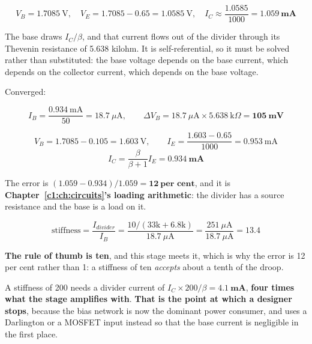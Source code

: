 \[
  V_B = 1.7085\ \text{V}, \quad V_E = 1.7085 - 0.65 = 1.0585\ \text{V}, \quad
  I_C \approx \frac{1.0585}{1000} = \mathbf{1.059\ \text{mA}}
\]


The base draws $I_C/\beta$, and that current flows out of the divider through its Thevenin resistance of 5.638 kilohm. It is self-referential, so it must be solved rather than substituted: the base voltage depends on the base current, which depends on the collector current, which depends on the base voltage.

Converged:

\[
  I_B = \frac{0.934\ \text{mA}}{50} = 18.7\ \mu\text{A}, \qquad
  \Delta V_B = 18.7\ \mu\text{A} \times 5.638\ \text{k}\Omega = \mathbf{105\ \text{mV}}
\]

\[
  V_B = 1.7085 - 0.105 = 1.603\ \text{V}, \qquad I_E = \frac{1.603 - 0.65}{1000}
  = 0.953\ \text{mA}
\]
\[
  I_C = \frac{\beta}{\beta + 1}I_E = \mathbf{0.934\ \text{mA}}
\]

The error is $(1.059 - 0.934)/1.059 = \mathbf{12\ \text{per cent}}$, and it is \textbf{Chapter~\ref{c1:ch:circuits}'s loading arithmetic}: the divider has a source resistance and the base is a load on it.


\[
  \text{stiffness} = \frac{I_{divider}}{I_B} = \frac{10/(33\text{k}+6.8\text{k})}{18.7\ \mu\text{A}}
  = \frac{251\ \mu\text{A}}{18.7\ \mu\text{A}} = \mathbf{13.4}
\]

\textbf{The rule of thumb is ten}, and this stage meets it, which is why the error is 12 per cent rather than 1: a stiffness of ten \emph{accepts} about a tenth of the droop.

A stiffness of 200 needs a divider current of $I_C \times 200/\beta = \mathbf{4.1\ \text{mA}}$, \textbf{four times what the stage amplifies with}. \textbf{That is the point at which a designer stops}, because the bias network is now the dominant power consumer, and uses a Darlington or a MOSFET input instead so that the base current is negligible in the first place.

